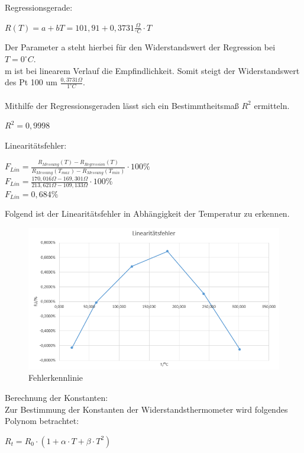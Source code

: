 \documentclass[a4paper,11pt,oneside]{article}
\begin{document}
Regressionsgerade:
\begin{center}
$R(T) = a + bT = 101,91 + 0,3731 \frac{\Omega}{{}^\circ C} \cdot T$
\end{center}
Der Parameter a steht hierbei für den Widerstandswert der Regression bei $T = 0^\circ C$. \\
m ist bei linearem Verlauf die Empfindlichkeit. Somit steigt der Widerstandswert des Pt 100 um $\frac{0,3731 \Omega}{1 ^\circ C}$. 
\\\\
Mithilfe der Regressionsgeraden lässt sich ein Bestimmtheitsmaß $R^2$ ermitteln. 
\begin{center}
$R^2 = 0,9998$
\end{center}
Linearitätsfehler:
\begin{center}
$F_{Lin} = \frac{R_{Messung}(T) - R_{Regression}(T)}{R_{Messung}(T_{max}) - R_{Messung}(T_{min})}\cdot 100\%$\\
\vspace{0.5cm}
$F_{Lin} = \frac{170,016\Omega - 169,301 \Omega}{213,621\Omega - 109,133\Omega}\cdot 100\%$\\
\vspace{0.5cm}
$F_{Lin} = 0,684 \%$
\end{center}

Folgend ist der Linearitätsfehler in Abhängigkeit der Temperatur zu erkennen.
\begin{figure}[h]
\centering
\includegraphics[scale=0.8]{Bilder/Aufg1Diagramm2.png}
\caption{Fehlerkennlinie}
\end{figure}

Berechnung der Konstanten:\\
Zur Bestimmung der Konstanten der Widerstandsthermometer wird folgendes Polynom betrachtet:

\begin{center}
$R_t = R_0 \cdot (1 + \alpha \cdot T + \beta \cdot T^2)$
\end{center}
\end{document}
